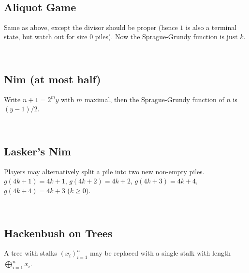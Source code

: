     \


    \subsection{Aliquot Game}
    Same as above, except the divisor should be proper (hence $1$ is also a terminal state, but watch out for size $0$ piles). Now the Sprague-Grundy function is just $k$.
    
    \

    \subsection{Nim (at most half)}
    Write $n+1 = 2^my$ with $m$ maximal, then the Sprague-Grundy function of $n$ is $(y - 1) / 2$.

    \


    \subsection{Lasker's Nim}
    Players may alternatively split a pile into two new non-empty piles. $g(4k+1) = 4k+1$, $g(4k+2) = 4k+2$, $g(4k+3) = 4k+4$, $g(4k+4) = 4k+3$ ($k\geq 0$).

    \


    \subsection{Hackenbush on Trees}
    A tree with stalks $(x_i)_{i=1}^n$ may be replaced with a single stalk with length $\bigoplus_{i=1}^n x_i$.

	
